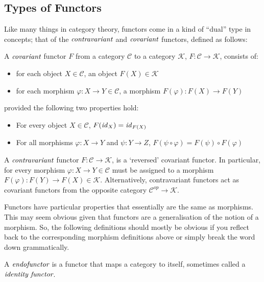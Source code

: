 \documentclass[10pt, oneside, reqno]{amsart}
\begin{document}
\subsection{Types of Functors} %
\label{subsec:functorstypes}
Like many things in category theory, functors come in a kind of ``dual'' type in concepts;
that of the $\emph{contravariant}$ and $\emph{covariant}$ functors, defined as follows:

\begin{defn}
 A $\emph{covariant}$ functor $F$ from a category $\mathcal{C}$ to a category $\mathcal{K}$, $F: \mathcal{C} \to \mathcal{K}$, consists of:
 \begin{itemize}
  \item for each object $X \in \mathcal{C}$, an object $F(X) \in \mathcal{K}$
  \item for each morphism $\varphi: X \to Y \in \mathcal{C}$, a morphism $F(\varphi): F(X) \to F(Y)$
 \end{itemize}
 provided the following two properties hold:
 \begin{itemize}
  \item For every object $X \in \mathcal{C}$, $F(\mathit{id}_{X}) = \mathit{id}_{F(X)}$
  \item For all morphisms $\varphi: X \to Y$ and $\psi: Y \to Z$, $F(\psi \circ \varphi) = F(\psi) \circ F(\varphi)$
 \end{itemize}
\end{defn}

\begin{defn}
 A $\emph{contravariant}$ functor $F: \mathcal{C} \to \mathcal{K}$, is a `reversed' covariant functor.
 In particular, for every morphism $\varphi: X \to Y \in \mathcal{C}$ must be assigned to a morphism $F(\varphi): F(Y) \to F(X) \in \mathcal{K}$.
 Alternatively, contravariant functors act as covariant functors from the opposite category $\mathcal{C}^{op} \to \mathcal{K}$.
\end{defn}

Functors have particular properties that essentially are the same as morphisms.
This may seem obvious given that functors are a generalisation of the notion of a morphism.
So, the following definitions should mostly be obvious if you reflect back to the corresponding morphism
definitions above or simply break the word down grammatically.

\begin{defn}[Endofunctor]
 A $\emph{endofunctor}$ is a functor that maps a category to itself, sometimes called a $\emph{identity functor}$.
\end{defn}
\end{document}
